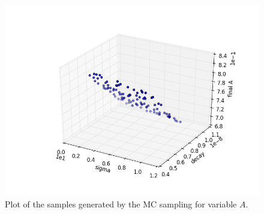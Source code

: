 \begin{figure}[h!]
  \centering
  \includegraphics[scale=0.7]{../../tests/framework/user_guide/ravenTutorial/gold/MonteCarlo/1-samplesPlot_A_scatter.png}
  \caption{Plot of the samples generated by the MC sampling for variable $A$.}
  \label{fig:samplesMCPlotLine_A}
\end{figure}
